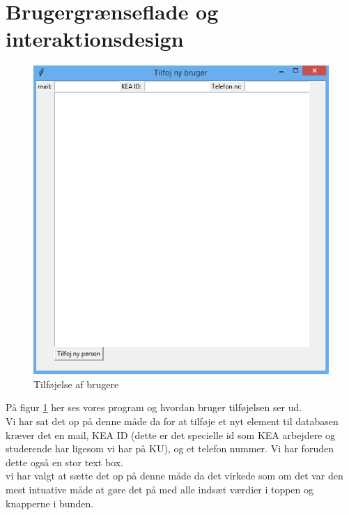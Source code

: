 \documentclass[a4paper]{article}
\begin{document}
\section{Brugergrænseflade og interaktionsdesign}
\begin{figure}[h!]
\centering
\includegraphics[width=1\textwidth]{Tilfojbruger.png}
\caption{Tilføjelse af brugere}
\label{fig:GUI1}
\end{figure}
På figur \ref{fig:GUI1} her ses vores program og hvordan bruger tilføjelsen ser ud.\\
Vi har sat det op på denne måde da for at tilføje et nyt element til databasen kræver det en mail, KEA ID (dette er det specielle id som KEA arbejdere og studerende har ligesom vi har på KU), og et telefon nummer. Vi har foruden dette også en stor text box.\\
vi har valgt at sætte det op på denne måde da det virkede som om det var den mest intuative måde at gøre det på med alle indsæt værdier i toppen og knapperne i bunden.\\
\pagebreak
\end{document}
